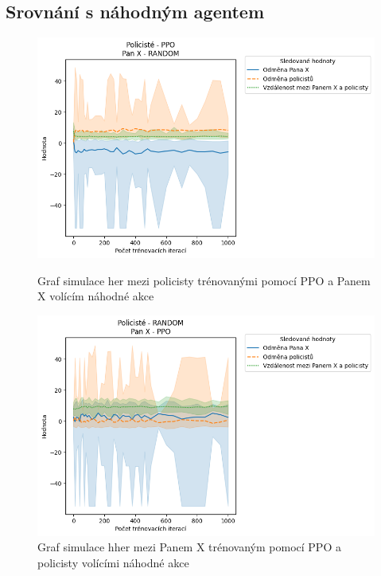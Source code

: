 \subsection*{Srovnání s náhodným agentem}
\begin{figure}[H]
  \begin{minipage}{.45\textwidth}
    \centering
    \includegraphics[width=1\textwidth]{obrazky-figures/graphs/cop_PPO_mrx_RANDOM.png}
    \caption{Graf simulace her mezi policisty trénovanými pomocí PPO a Panem X volícím náhodné akce}
    \label{fig:cop_ppo_mrx_random}
  \end{minipage}\hfill
  \begin{minipage}{.45\textwidth}
    \centering
    \includegraphics[width=1\textwidth]{obrazky-figures/graphs/cop_RANDOM_mrx_PPO.png}
      \caption{Graf simulace hher mezi Panem X trénovaným pomocí PPO a policisty volícími náhodné akce}
      \label{fig:cop_random_mrx_ppo}
  \end{minipage}
  \end{figure}

